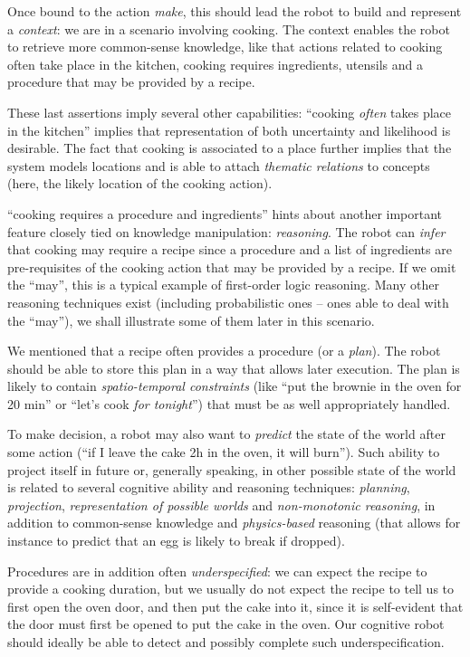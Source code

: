 \documentclass[a4paper, twocolumn]{article}
\begin{document}
Once bound to the action \emph{make}, this should lead the robot to build and
represent a \emph{context}: we are in a scenario involving cooking. The context
enables the robot to retrieve more common-sense knowledge, like that actions
related to cooking often take place in the kitchen, cooking requires
ingredients, utensils and a procedure that may be provided by a recipe.

These last assertions imply several other capabilities: ``cooking \emph{often} takes
place in the kitchen'' implies that representation of both uncertainty and
likelihood is desirable. The fact that cooking is associated to a place further
implies that the system models locations and is able to attach \emph{thematic
relations} to concepts (here, the likely location of the cooking action).

``cooking requires a procedure and ingredients'' hints about another important
feature closely tied on knowledge manipulation: \emph{reasoning}. The robot can
\emph{infer} that cooking may require a recipe since a procedure and a list of
ingredients are pre-requisites of the cooking action that may be provided by a
recipe.  If we omit the ``may'', this is a typical example of first-order logic
reasoning.  Many other reasoning techniques exist (including probabilistic ones
-- ones able to deal with the ``may''), we shall illustrate some of them later
in this scenario.

We mentioned that a recipe often provides a procedure (or a \emph{plan}). The
robot should be able to store this plan in a way that allows later execution.
The plan is likely to contain \emph{spatio-temporal constraints} (like ``put
the brownie in the oven for 20 min'' or ``let's cook \emph{for tonight}'') that
must be as well appropriately handled.

To make decision, a robot may also want to \emph{predict} the state of the
world after some action (``if I leave the cake 2h in the oven, it will burn'').
Such ability to project itself in future or, generally speaking, in other
possible state of the world is related to several cognitive ability and
reasoning techniques: \emph{planning}, \emph{projection}, \emph{representation
of possible worlds} and \emph{non-monotonic reasoning}, in addition to
common-sense knowledge and \emph{physics-based} reasoning (that allows for
instance to predict that an egg is likely to break if dropped).

Procedures are in addition often \emph{underspecified}: we can expect the
recipe to provide a cooking duration, but we usually do not expect the recipe
to tell us to first open the oven door, and then put the cake into it, since it
is self-evident that the door must first be opened to put the cake in the oven.
Our cognitive robot should ideally be able to detect and possibly complete such
underspecification.
\end{document}
